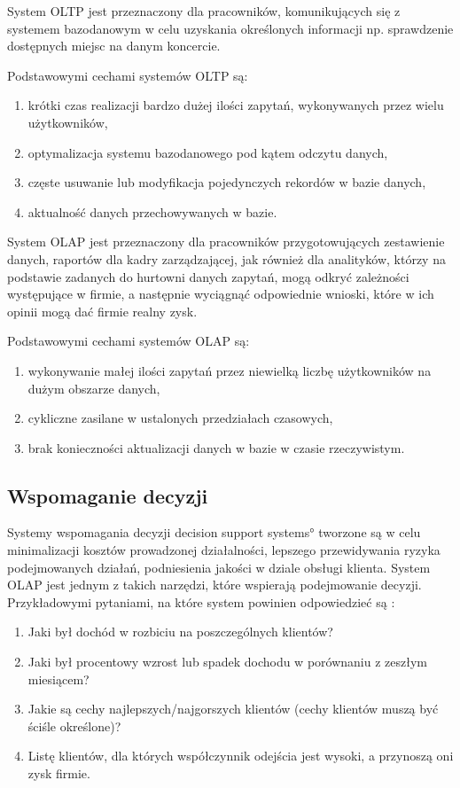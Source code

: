 System OLTP jest przeznaczony dla pracowników, komunikujących się 
 z systemem bazodanowym w celu uzyskania określonych informacji 
 np. sprawdzenie dostępnych miejsc na danym koncercie.

Podstawowymi cechami systemów OLTP są:
\begin{enumerate}
 \item krótki czas realizacji bardzo dużej ilości zapytań, wykonywanych przez wielu użytkowników\label{OLTP_1},
 \item optymalizacja systemu bazodanowego pod kątem odczytu danych,
 \item częste usuwanie lub modyfikacja pojedynczych rekordów w bazie danych,
 \item aktualność danych przechowywanych w bazie.
\end{enumerate}

System OLAP jest przeznaczony dla pracowników przygotowujących zestawienie danych,
 raportów dla kadry zarządzającej,
 jak również dla analityków, 
 którzy na podstawie zadanych do hurtowni danych zapytań,
 mogą odkryć zależności występujące w firmie, a następnie wyciągnąć odpowiednie wnioski,
 które w ich opinii mogą dać firmie realny zysk.
 
Podstawowymi cechami systemów OLAP są:
\begin{enumerate}
 \item wykonywanie małej ilości zapytań przez niewielką liczbę użytkowników na dużym obszarze danych,
 \item cykliczne zasilane w ustalonych przedziałach czasowych,
 \item brak konieczności aktualizacji danych w bazie w czasie rzeczywistym.
\end{enumerate}


\subsection{Wspomaganie decyzji }
Systemy wspomagania decyzji \ang{decision support systems} tworzone są 
 w celu minimalizacji kosztów prowadzonej działalności,
 lepszego przewidywania ryzyka podejmowanych działań, podniesienia jakości w dziale obsługi klienta.
System OLAP jest 
 jednym z takich narzędzi, które wspierają podejmowanie decyzji.
Przykładowymi pytaniami, na które system powinien odpowiedzieć są\cite{TodMan} :
 \begin{enumerate}
  \item Jaki był dochód w rozbiciu na poszczególnych klientów?
  \item Jaki był procentowy wzrost lub spadek dochodu w porównaniu z zeszłym miesiącem?
  \item Jakie są cechy najlepszych/najgorszych klientów (cechy klientów muszą być ściśle określone)?
  \item Listę klientów, dla których współczynnik odejścia jest wysoki, a przynoszą oni zysk firmie.
 
 \end{enumerate}

